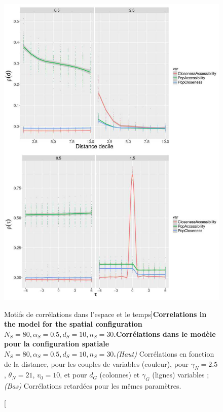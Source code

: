 \begin{figure}
\includegraphics[width=\linewidth,height=0.9\textheight]{Figures/Final/6-1-3-fig-macrocoevolexplo-correlations.jpg}
	\caption[Correlations][Motifs de corrélations dans l'espace et le temps]{\textbf{Correlations in the model for the spatial configuration $N_S=80,\alpha_S=0.5,d_S=10,n_S=30$.}\label{fig:macrocoevolexplo:correlations}}{\textbf{Corrélations dans le modèle pour la configuration spatiale $N_S=80,\alpha_S=0.5,d_S=10,n_S=30$.}\textit{(Haut)} Corrélations en fonction de la distance, pour les couples de variables (couleur), pour $\gamma_N = 2.5$, $\theta_N = 21$, $v_0 = 10$, et pour $d_G$ (colonnes) et $\gamma_G$ (lignes) variables ; \textit{(Bas)} Corrélations retardées pour les mêmes paramètres.\label{fig:macrocoevolexplo:correlations}}
\end{figure}


